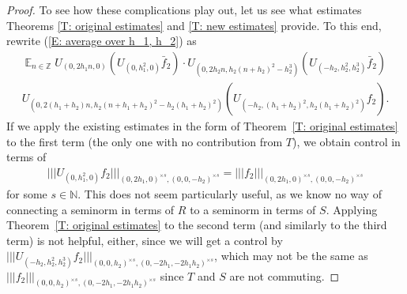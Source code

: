 \documentclass[11pt]{amsart}
\theoremstyle{definition}
\DeclareMathOperator*{\E}{\mathbb{E}}
\newcommand{\N}{{\mathbb N}}
\newcommand{\Z}{{\mathbb Z}}
\newcommand{\nnorm}[1]{\lvert\!|\!| #1|\!|\!\rvert}
\newcommand{\1}{{\mathbf{1}}}
\begin{document}
\begin{proof}
    
      To see how these complications play out, let us see what estimates Theorems \ref{T: original estimates} and \ref{T: new estimates} provide. To this end, rewrite (\ref{E: average over h_1, h_2}) as
     \begin{multline}\nonumber
        \E_{n\in\Z}U_{(0, 2h_1 n,0)}(U_{(0,h_1^2,0)}\bar f_2)\cdot U_{(0,2h_2 n,h_2(n+h_2)^2-h_{2}^{3})}(U_{(-h_{2},h_{2}^{2},h_{2}^{3})}\bar f_2)\\
        U_{(0, 2(h_1+h_2) n, h_2(n+h_1+h_2)^2-h_{2}(h_{1}+h_{2})^{2})}(U_{(-h_{2},(h_{1}+h_{2})^{2},h_{2}(h_{1}+h_{2})^{2})}f_2).
    \end{multline}
    If we apply the existing estimates in the form of Theorem~\ref{T: original estimates} to the first term (the only one with no contribution from $T$), we obtain control in terms of
    \begin{align}\label{E: naive control}
     \nnorm{U_{(0,h_1^2,0)} f_2}_{(0,2h_1,0)^{\times s}, (0,0,-h_{2})^{\times s}}=\nnorm{f_2}_{(0,2h_1,0)^{\times s}, (0,0,-h_{2})^{\times s}}
    \end{align}
     for some $s\in\N$. This does not seem particularly useful, as we know no way of connecting a seminorm in terms of $R$ to a seminorm in terms of $S$. Applying Theorem~\ref{T: original estimates} to the second term (and similarly to the third term) is not helpful, either, since we will get a control by
      $\nnorm{U_{(-h_{2},h_2^2,h_{2}^{3})} f_2}_{(0,0,h_2)^{\times s}, (0,-2h_{1},-2h_{1}h_{2})^{\times s}}$, which may not be the same as $\nnorm{f_2}_{(0,0,h_2)^{\times s}, (0,-2h_{1},-2h_{1}h_{2})^{\times s}}$ since $T$ and $S$ are not commuting.


\end{proof}
\end{document}
